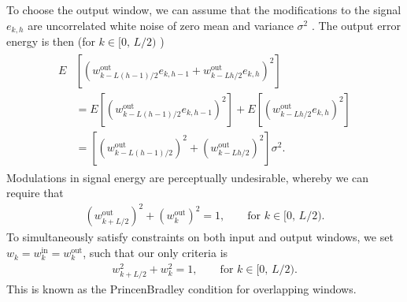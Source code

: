 \documentclass[letterpaper,10pt,english]{jupyterBook}
\begin{document}
\sphinxAtStartPar
To choose the output window, we can assume that the modifications to the
signal \(e_{k,h}\) are uncorrelated white noise of zero mean and
variance \( \sigma^2 \) . The output error energy is then (for \(
k\in[0,\,L/2) \) )
\begin{equation*}
\begin{split} \begin{split}
E&\left[\left(w^{\text{out}}_{k-L(h-1)/2}e_{k,h-1}+w^{\text{out}}_{k-Lh/2}e_{k,h}\right)^2\right]
\\& =
E\left[\left(w^{\text{out}}_{k-L(h-1)/2}e_{k,h-1}\right)^2\right]
+E\left[\left(w^{\text{out}}_{k-Lh/2}e_{k,h}\right)^2\right]
\\& = \left[\left(w^{\text{out}}_{k-L(h-1)/2}\right)^2
+\left(w^{\text{out}}_{k-Lh/2}\right)^2 \right]\sigma^2.
\end{split} \end{split}
\end{equation*}
\sphinxAtStartPar
Modulations in signal energy are perceptually undesirable, whereby we
can require that
\begin{equation*}
\begin{split} \left(w^{\text{out}}_{k+L/2}\right)^2
+\left(w^{\text{out}}_{k}\right)^2 =
1,\qquad\text{for } k\in[0,\,L/2). \end{split}
\end{equation*}
\sphinxAtStartPar
To simultaneously satisfy constraints on both input and output windows, we set \(w_k=w^{\text{in}}_{k}=w^{\text{out}}_{k}\),
such that our only criteria is
\begin{equation*}
\begin{split} \boxed{w_{k+L/2}^2 + w_{k}^2 =
1,\qquad\text{for } k\in[0,\,L/2).} \end{split}
\end{equation*}
\sphinxAtStartPar
This is known as the Princen\sphinxhyphen{}Bradley condition for overlapping
windows. 

\sphinxAtStartPar
{}
\end{document}
